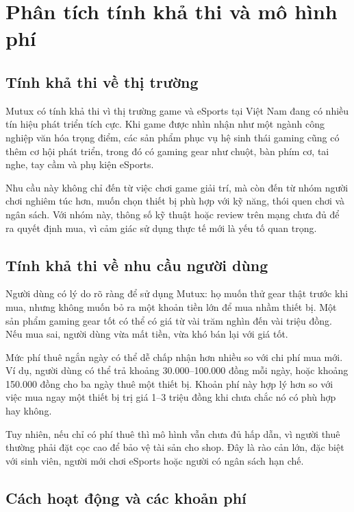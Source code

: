 \section{Phân tích tính khả thi và mô hình phí}

\subsection{Tính khả thi về thị trường}

Mutux có tính khả thi vì thị trường game và eSports tại Việt Nam đang có nhiều tín hiệu phát triển tích cực. Khi game được nhìn nhận như một ngành công nghiệp văn hóa trọng điểm, các sản phẩm phục vụ hệ sinh thái gaming cũng có thêm cơ hội phát triển, trong đó có gaming gear như chuột, bàn phím cơ, tai nghe, tay cầm và phụ kiện eSports.

Nhu cầu này không chỉ đến từ việc chơi game giải trí, mà còn đến từ nhóm người chơi nghiêm túc hơn, muốn chọn thiết bị phù hợp với kỹ năng, thói quen chơi và ngân sách. Với nhóm này, thông số kỹ thuật hoặc review trên mạng chưa đủ để ra quyết định mua, vì cảm giác sử dụng thực tế mới là yếu tố quan trọng.

\subsection{Tính khả thi về nhu cầu người dùng}

Người dùng có lý do rõ ràng để sử dụng Mutux: họ muốn thử gear thật trước khi mua, nhưng không muốn bỏ ra một khoản tiền lớn để mua nhầm thiết bị. Một sản phẩm gaming gear tốt có thể có giá từ vài trăm nghìn đến vài triệu đồng. Nếu mua sai, người dùng vừa mất tiền, vừa khó bán lại với giá tốt.

Mức phí thuê ngắn ngày có thể dễ chấp nhận hơn nhiều so với chi phí mua mới. Ví dụ, người dùng có thể trả khoảng 30.000--100.000 đồng mỗi ngày, hoặc khoảng 150.000 đồng cho ba ngày thuê một thiết bị. Khoản phí này hợp lý hơn so với việc mua ngay một thiết bị trị giá 1--3 triệu đồng khi chưa chắc nó có phù hợp hay không.

Tuy nhiên, nếu chỉ có phí thuê thì mô hình vẫn chưa đủ hấp dẫn, vì người thuê thường phải đặt cọc cao để bảo vệ tài sản cho shop. Đây là rào cản lớn, đặc biệt với sinh viên, người mới chơi eSports hoặc người có ngân sách hạn chế.

\subsection{Cách hoạt động và các khoản phí}

